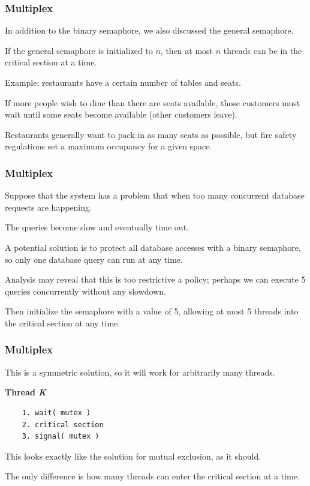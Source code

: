 \begin{frame}
\frametitle{Multiplex}
In addition to the binary semaphore, we also discussed the general semaphore. 

If the general semaphore is initialized to $n$, then at most $n$ threads can be in the critical section at a time. 

Example: restaurants have a certain number of tables and seats. 

If more people wish to dine than there are seats available, those customers must wait until some seats become available (other customers leave). 

Restaurants generally want to pack in as many seats as possible, but fire safety regulations set a maximum occupancy for a given space.

\end{frame}

\begin{frame}
\frametitle{Multiplex}

Suppose that the system has a problem that when too many concurrent database requests are happening. 

The queries become slow and eventually time out. 

A potential solution is to protect all database accesses with a binary semaphore, so only one database query can run at any time. 

Analysis may reveal that this is too restrictive a policy; perhaps we can execute 5 queries concurrently without any slowdown. 

Then initialize the semaphore with a value of 5, allowing at most 5 threads into the critical section at any time.


\end{frame}

\begin{frame}[fragile]
\frametitle{Multiplex}


This is a symmetric solution, so it will work for arbitrarily many threads.

\textbf{Thread \textit{K}}\vspace{-6em}
  \begin{verbatim}
	1. wait( mutex )
	2. critical section
	3. signal( mutex )
  \end{verbatim}
\vspace{-2em}

This looks exactly like the solution for mutual exclusion, as it should. 

The only difference is how many threads can enter the critical section at a time.



\end{frame}

